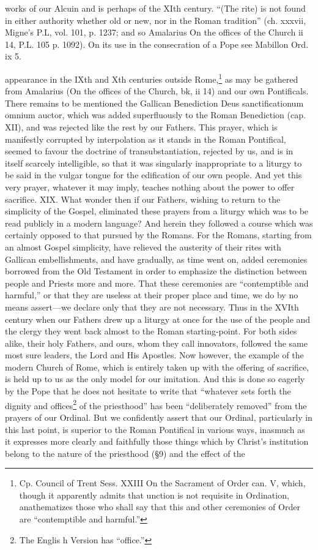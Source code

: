 works of our Alcuin and is perhaps of the XIth century. “(The rite) is not found in either authority whether old or new, nor in the Roman tradition” (ch. xxxvii, Migne’s P.L, vol. 101, p. 1237; and so Amalarius On the offices of the Church ii 14, P.L. 105 p. 1092). On its use in the consecration of a Pope see Mabillon Ord. ix 5.

appearance in the IXth and Xth centuries outside Rome,\footnote{Cp. Council of Trent Sess. XXIII On the Sacrament of Order can. V, which, though it apparently admits that unction is not requisite in Ordination, anathematizes those who shall say that this and other ceremonies of Order are “contemptible and harmful.”} as may be gathered from Amalarius (On the offices of the Church, bk, ii 14) and our own Pontificals. There remains to be mentioned the Gallican Benediction Deus sanctificationum omnium auctor, which was added superfluously to the Roman Benediction (cap. XII), and was rejected like the rest by our Fathers. This prayer, which is manifestly corrupted by interpolation as it stands in the Roman Pontifical, seemed to favour the doctrine of transubstantiation, rejected by us, and is in itself scarcely intelligible, so that it was singularly inappropriate to a liturgy to be said in the vulgar tongue for the edification of our own people. And yet this very prayer, whatever it may imply, teaches nothing about the power to offer sacrifice. XIX. What wonder then if our Fathers, wishing to return to the simplicity of the Gospel, eliminated these prayers from a liturgy which was to be read publicly in a modern language? And herein they followed a course which was certainly opposed to that pursued by the Romans. For the Romans, starting from an almost Gospel simplicity, have relieved the austerity of their rites with Gallican embellishments, and have gradually, as time went on, added ceremonies borrowed from the Old Testament in order to emphasize the distinction between people and Priests more and more. That these ceremonies are “contemptible and harmful,” or that they are useless at their proper place and time, we do by no means assert—we declare only that they are not necessary. Thus in the XVIth century when our Fathers drew up a liturgy at once for the use of the people and the clergy they went back almost to the Roman starting-point. For both sides alike, their holy Fathers, and ours, whom they call innovators, followed the same most sure leaders, the Lord and His Apostles. Now however, the example of the modern Church of Rome, which is entirely taken up with the offering of sacrifice, is held up to us as the only model for our imitation. And this is done so eagerly by the Pope that he does not hesitate to write that “whatever sets forth the dignity and offices\footnote{The Englis h Version has “office.”} of the priesthood” has been “deliberately removed” from the prayers of our Ordinal. But we confidently assert that our Ordinal, particularly in this last point, is superior to the Roman Pontifical in various ways, inasmuch as it expresses more clearly and faithfully those things which by Christ’s institution belong to the nature of the priesthood (§9) and the effect of the

